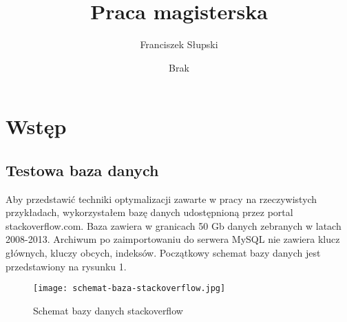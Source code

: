 \documentclass[12pt]{article}
\title{Praca magisterska}
\author{Franciszek Słupski}
\date{Brak}
\begin{document}
\maketitle


\section{Wstęp}

\subsection{Testowa baza danych}
Aby przedstawić techniki optymalizacji zawarte w pracy na rzeczywistych przykładach, wykorzystałem bazę danych udostępnioną przez portal stackoverflow.com. Baza zawiera w granicach 50 Gb danych zebranych w latach 2008-2013. Archiwum po zaimportowaniu do serwera MySQL nie zawiera klucz głównych, kluczy obcych, indeksów.
Początkowy schemat bazy danych jest przedstawiony na rysunku 1.
\begin{figure}
    \texttt{[image: schemat-baza-stackoverflow.jpg]} 
    \caption{Schemat bazy danych stackoverflow}
\end{figure}








\end{document}

